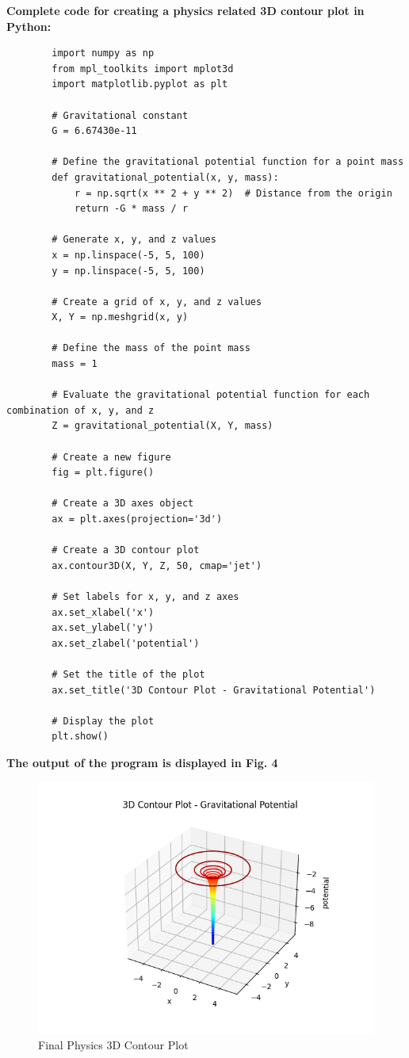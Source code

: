 \documentclass[
11pt, %
a4paper, %
oneside, %
headinclude,footinclude, %
BCOR5mm, %
]{scrartcl}
\begin{document}
	\textbf{Complete code for creating a physics related 3D contour plot in Python:}
	\begin{verbatim}
		import numpy as np
		from mpl_toolkits import mplot3d
		import matplotlib.pyplot as plt
		
		# Gravitational constant
		G = 6.67430e-11
		
		# Define the gravitational potential function for a point mass
		def gravitational_potential(x, y, mass):
		    r = np.sqrt(x ** 2 + y ** 2)  # Distance from the origin
		    return -G * mass / r
		
		# Generate x, y, and z values
		x = np.linspace(-5, 5, 100)
		y = np.linspace(-5, 5, 100)
		
		# Create a grid of x, y, and z values
		X, Y = np.meshgrid(x, y)
		
		# Define the mass of the point mass
		mass = 1
		
		# Evaluate the gravitational potential function for each combination of x, y, and z
		Z = gravitational_potential(X, Y, mass)
		
		# Create a new figure
		fig = plt.figure()
		
		# Create a 3D axes object
		ax = plt.axes(projection='3d')
		
		# Create a 3D contour plot
		ax.contour3D(X, Y, Z, 50, cmap='jet')
		
		# Set labels for x, y, and z axes
		ax.set_xlabel('x')
		ax.set_ylabel('y')
		ax.set_zlabel('potential')
		
		# Set the title of the plot
		ax.set_title('3D Contour Plot - Gravitational Potential')
		
		# Display the plot
		plt.show()
	\end{verbatim}
	\textbf{The output of the program is displayed in Fig. 4}
	
	\begin{figure}[H]
		\centering %
		\includegraphics[width=0.4\columnwidth]{Figures/Figure4.png} 
		\caption[Final Physics 3D Contour Plot]{Final Physics 3D Contour Plot} %
		\label{fig:gallery} 
	\end{figure}

\renewcommand{\refname}{\spacedlowsmallcaps{References}} %
\raggedright



\end{document}
